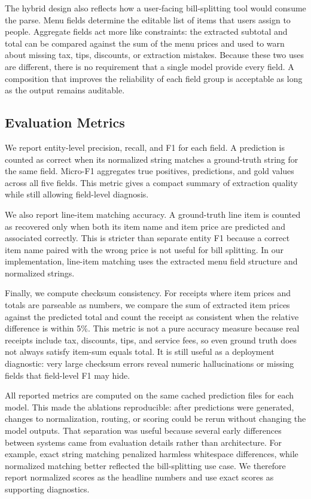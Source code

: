 \documentclass[9pt,twocolumn,twoside]{extarticle}
\begin{document}
The hybrid design also reflects how a user-facing bill-splitting tool would consume the parse. Menu fields determine the editable list of items that users assign to people. Aggregate fields act more like constraints: the extracted subtotal and total can be compared against the sum of the menu prices and used to warn about missing tax, tips, discounts, or extraction mistakes. Because these two uses are different, there is no requirement that a single model provide every field. A composition that improves the reliability of each field group is acceptable as long as the output remains auditable.

\subsection{Evaluation Metrics}
\label{sec:metrics}

We report entity-level precision, recall, and F1 for each field. A prediction is counted as correct when its normalized string matches a ground-truth string for the same field. Micro-F1 aggregates true positives, predictions, and gold values across all five fields. This metric gives a compact summary of extraction quality while still allowing field-level diagnosis.

We also report line-item matching accuracy. A ground-truth line item is counted as recovered only when both its item name and item price are predicted and associated correctly. This is stricter than separate entity F1 because a correct item name paired with the wrong price is not useful for bill splitting. In our implementation, line-item matching uses the extracted menu field structure and normalized strings.

Finally, we compute checksum consistency. For receipts where item prices and totals are parseable as numbers, we compare the sum of extracted item prices against the predicted total and count the receipt as consistent when the relative difference is within 5\%. This metric is not a pure accuracy measure because real receipts include tax, discounts, tips, and service fees, so even ground truth does not always satisfy item-sum equals total. It is still useful as a deployment diagnostic: very large checksum errors reveal numeric hallucinations or missing fields that field-level F1 may hide.

All reported metrics are computed on the same cached prediction files for each model. This made the ablations reproducible: after predictions were generated, changes to normalization, routing, or scoring could be rerun without changing the model outputs. That separation was useful because several early differences between systems came from evaluation details rather than architecture. For example, exact string matching penalized harmless whitespace differences, while normalized matching better reflected the bill-splitting use case. We therefore report normalized scores as the headline numbers and use exact scores as supporting diagnostics.
\end{document}
